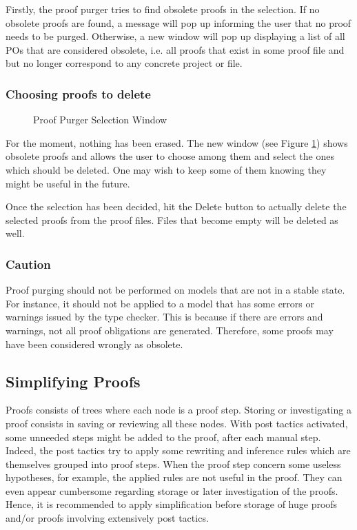 Firstly, the proof purger tries to find obsolete proofs in the selection. If no obsolete proofs are found, a message will pop up informing the user that no proof needs to be purged. Otherwise, a new window will pop up displaying a list of all POs that are considered obsolete, i.e. all proofs that exist in some proof file and but no longer correspond to any concrete project or file.

\subsubsection{Choosing proofs to delete}

\begin{figure}[h!t]
\begin{center}
	\caption{Proof Purger Selection Window}
	\label{fig_ref_10_proof_purger}
\end{center}
\end{figure}

For the moment, nothing has been erased. The new window (see Figure \ref{fig_ref_10_proof_purger}) shows obsolete proofs and allows the user to choose among them and select the ones which should be deleted. One may wish to keep some of them knowing they might be useful in the future.

Once the selection has been decided, hit the \textsf{Delete} button to actually delete the selected proofs from the proof files. Files that become empty will be deleted as well.

\subsubsection{Caution}

Proof purging should not be performed on models that are not in a stable state. For instance, it should not be applied to a model that has some errors or warnings issued by the type checker. This is because if there are errors and warnings, not all proof obligations are generated. Therefore, some proofs may have been considered wrongly as obsolete.

\subsection{Simplifying Proofs}
\label{simplifying_proofs}

Proofs consists of trees where each node is a proof step. Storing or investigating a proof consists in saving or reviewing all these nodes. With post tactics activated, some unneeded steps might be added to the proof, after each manual step. Indeed, the post tactics try to apply some rewriting and inference rules which are themselves grouped into proof steps. When the proof step concern some useless hypotheses, for example, the applied rules are not useful in the proof. They can even appear cumbersome regarding storage or later investigation of the proofs. Hence, it is recommended to apply simplification before storage of huge proofs and/or proofs involving extensively post tactics.

